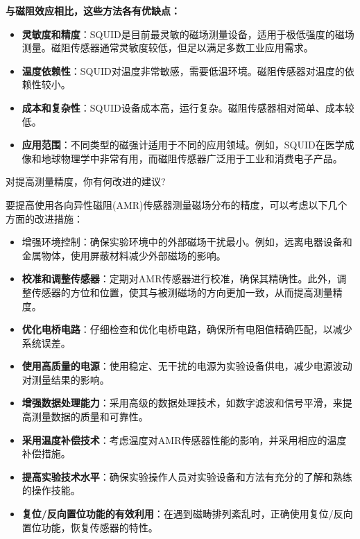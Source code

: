 \documentclass[dvipsnames, svgnames,a4paper,11pt]{article}
\begin{document}
	\textbf{与磁阻效应相比，这些方法各有优缺点：}
	\begin{itemize}
		\item \textbf{灵敏度和精度}：SQUID是目前最灵敏的磁场测量设备，适用于极低强度的磁场测量。磁阻传感器通常灵敏度较低，但足以满足多数工业应用需求。
		\item \textbf{温度依赖性}：SQUID对温度非常敏感，需要低温环境。磁阻传感器对温度的依赖性较小。
		\item \textbf{成本和复杂性}：SQUID设备成本高，运行复杂。磁阻传感器相对简单、成本较低。
		\item \textbf{应用范围}：不同类型的磁强计适用于不同的应用领域。例如，SQUID在医学成像和地球物理学中非常有用，而磁阻传感器广泛用于工业和消费电子产品。
	\end{itemize}
	
	\begin{question}
		对提高测量精度，你有何改进的建议?
	\end{question}
	要提高使用各向异性磁阻(AMR)传感器测量磁场分布的精度，可以考虑以下几个方面的改进措施：
	\begin{itemize}
		\item 增强环境控制：确保实验环境中的外部磁场干扰最小。例如，远离电器设备和金属物体，使用屏蔽材料减少外部磁场的影响。
		
		\item \textbf{校准和调整传感器}：定期对AMR传感器进行校准，确保其精确性。此外，调整传感器的方位和位置，使其与被测磁场的方向更加一致，从而提高测量精度。
		
		\item \textbf{优化电桥电路}：仔细检查和优化电桥电路，确保所有电阻值精确匹配，以减少系统误差。
		
		\item \textbf{使用高质量的电源}：使用稳定、无干扰的电源为实验设备供电，减少电源波动对测量结果的影响。
		
		\item \textbf{增强数据处理能力}：采用高级的数据处理技术，如数字滤波和信号平滑，来提高测量数据的质量和可靠性。
		
		\item \textbf{采用温度补偿技术}：考虑温度对AMR传感器性能的影响，并采用相应的温度补偿措施。
		
		\item \textbf{提高实验技术水平}：确保实验操作人员对实验设备和方法有充分的了解和熟练的操作技能。
		
		\item \textbf{复位/反向置位功能的有效利用}：在遇到磁畴排列紊乱时，正确使用复位/反向置位功能，恢复传感器的特性。
	\end{itemize}
	
\end{document}
